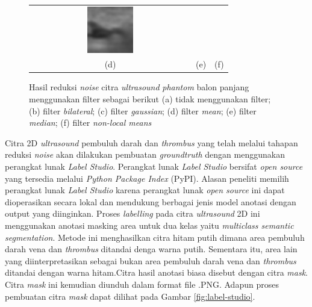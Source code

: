 {\begin{figure}[h]
\begin{tabular}{ccc}
		\includegraphics[width=0.3\textwidth]{bab4/citra-nlm.jpg} \\
		(d)  & (e)  & (f)  %
	\end{tabular}
	\caption{Hasil reduksi \textit{noise} citra \textit{ultrasound} \textit{phantom} balon panjang menggunakan filter sebagai berikut (a) tidak menggunakan filter; (b) filter \textit{bilateral}; (c) filter \textit{gaussian}; (d) filter \textit{mean}; (e) filter \textit{median}; (f) filter \textit{non-local means}}
	\label{fig:hasil_denoising_ori}
\end{figure}

Citra 2D \textit{ultrasound} pembuluh darah dan \textit{thrombus} yang telah melalui tahapan reduksi \textit{noise} akan dilakukan pembuatan \textit{groundtruth} dengan menggunakan perangkat lunak \textit{Label Studio}. Perangkat lunak \textit{Label Studio} bersifat \textit{open source} yang tersedia melalui \textit{Python Package Index} (PyPI). Alasan peneliti memilih perangkat lunak \textit{Label Studio} karena perangkat lunak \textit{open source} ini dapat dioperasikan secara lokal dan mendukung berbagai jenis model anotasi dengan output yang diinginkan. Proses \textit{labelling} pada citra \textit{ultrasound} 2D ini menggunakan anotasi masking area untuk dua kelas yaitu \textit{multiclass semantic segmentation}. Metode ini menghasilkan citra hitam putih dimana area pembuluh darah vena dan \textit{thrombus} ditandai denga warna putih. Sementara itu, area lain yang diinterpretasikan sebagai bukan area pembuluh darah vena dan \textit{thrombus} ditandai dengan warna hitam.Citra hasil anotasi biasa disebut dengan citra \textit{mask}. Citra \textit{mask} ini kemudian diunduh dalam format file .PNG. Adapun proses pembuatan citra \textit{mask} dapat dilihat pada Gambar \ref{fig:label-studio}.

}
